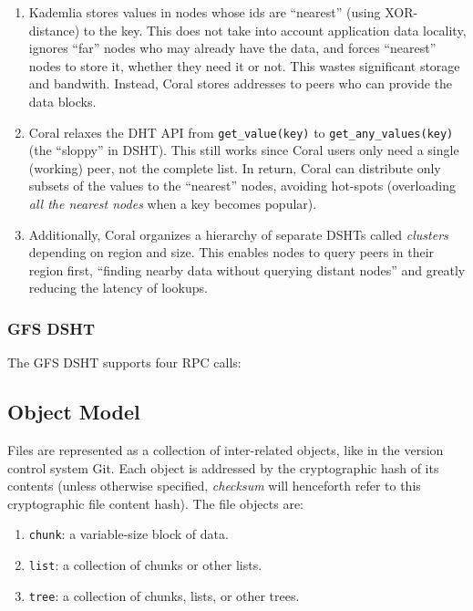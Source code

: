 \documentclass{sig-alternate}
\begin{document}
\begin{enumerate}

  \item Kademlia stores values in nodes whose ids are ``nearest'' (using
        XOR-distance) to the key. This does not take into account application
        data locality, ignores ``far'' nodes who may already have the data, and
        forces ``nearest'' nodes to store it, whether they need it or not.
        This wastes significant storage and bandwith. Instead, Coral stores
        addresses to peers who can provide the data blocks.

  \item Coral relaxes the DHT API from \texttt{get\_value(key)} to
        \texttt{get\_any\_values(key)} (the ``sloppy'' in DSHT).
        This still works since Coral users only need a single (working) peer,
        not the complete list. In return, Coral can distribute only subsets of
        the values to the ``nearest'' nodes, avoiding hot-spots (overloading
        \textit{all the nearest nodes} when a key becomes popular).

  \item Additionally, Coral organizes a hierarchy of separate DSHTs called
        \textit{clusters} depending on region and size. This enables nodes to
        query peers in their region first, ``finding nearby data without
        querying distant nodes'' and greatly reducing the latency of
        lookups.

\end{enumerate}


\subsubsection{GFS DSHT}

The GFS DSHT supports four RPC calls:




\subsection{Object Model}

Files are represented as a collection of inter-related objects, like in the
version control system Git. Each object is addressed by the cryptographic hash of its contents (unless otherwise specified, \textit{checksum} will henceforth refer to this cryptographic file content hash). The file objects are:

\begin{enumerate}
  \item \texttt{chunk}: a variable-size block of data.
  \item \texttt{list}: a collection of chunks or other lists.
  \item \texttt{tree}: a collection of chunks, lists, or other trees.
\end{enumerate}
\end{document}
